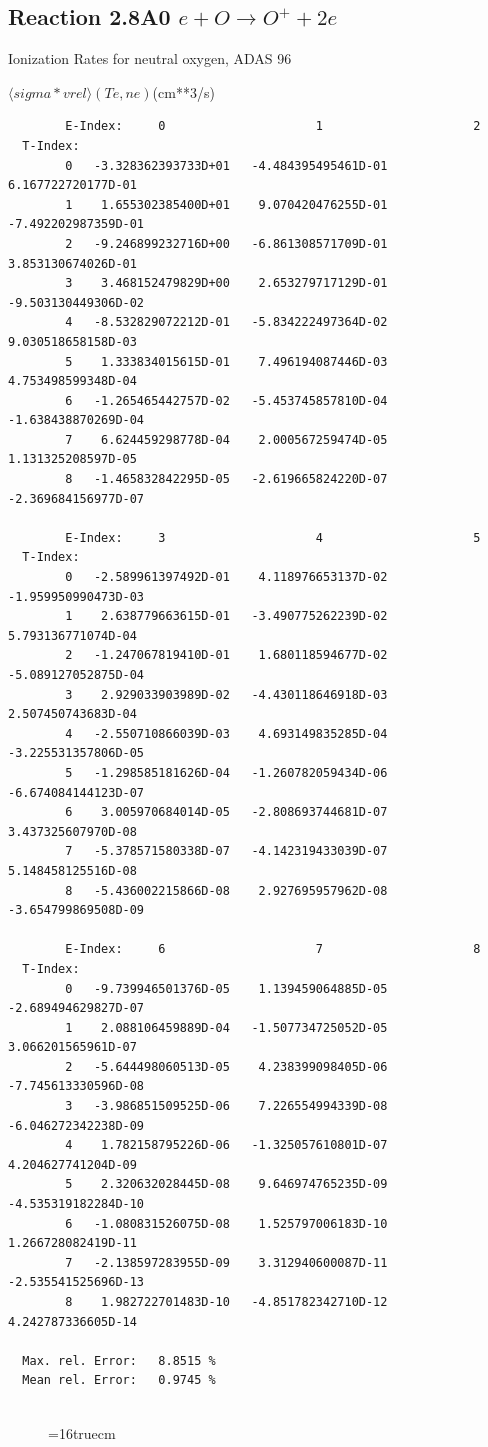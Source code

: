 \documentclass[12pt,dvips]{article}
\begin{document}
\subsection{
Reaction 2.8A0 $e + O \rightarrow O^+  + 2e $ }
  Ionization Rates for neutral  oxygen,   ADAS 96

$  \langle sigma*vrel \rangle(Te,ne) $(cm**3/s)
\begin{small}\begin{verbatim}
        E-Index:     0                     1                     2
  T-Index:
        0   -3.328362393733D+01   -4.484395495461D-01    6.167722720177D-01
        1    1.655302385400D+01    9.070420476255D-01   -7.492202987359D-01
        2   -9.246899232716D+00   -6.861308571709D-01    3.853130674026D-01
        3    3.468152479829D+00    2.653279717129D-01   -9.503130449306D-02
        4   -8.532829072212D-01   -5.834222497364D-02    9.030518658158D-03
        5    1.333834015615D-01    7.496194087446D-03    4.753498599348D-04
        6   -1.265465442757D-02   -5.453745857810D-04   -1.638438870269D-04
        7    6.624459298778D-04    2.000567259474D-05    1.131325208597D-05
        8   -1.465832842295D-05   -2.619665824220D-07   -2.369684156977D-07

        E-Index:     3                     4                     5
  T-Index:
        0   -2.589961397492D-01    4.118976653137D-02   -1.959950990473D-03
        1    2.638779663615D-01   -3.490775262239D-02    5.793136771074D-04
        2   -1.247067819410D-01    1.680118594677D-02   -5.089127052875D-04
        3    2.929033903989D-02   -4.430118646918D-03    2.507450743683D-04
        4   -2.550710866039D-03    4.693149835285D-04   -3.225531357806D-05
        5   -1.298585181626D-04   -1.260782059434D-06   -6.674084144123D-07
        6    3.005970684014D-05   -2.808693744681D-07    3.437325607970D-08
        7   -5.378571580338D-07   -4.142319433039D-07    5.148458125516D-08
        8   -5.436002215866D-08    2.927695957962D-08   -3.654799869508D-09

        E-Index:     6                     7                     8
  T-Index:
        0   -9.739946501376D-05    1.139459064885D-05   -2.689494629827D-07
        1    2.088106459889D-04   -1.507734725052D-05    3.066201565961D-07
        2   -5.644498060513D-05    4.238399098405D-06   -7.745613330596D-08
        3   -3.986851509525D-06    7.226554994339D-08   -6.046272342238D-09
        4    1.782158795226D-06   -1.325057610801D-07    4.204627741204D-09
        5    2.320632028445D-08    9.646974765235D-09   -4.535319182284D-10
        6   -1.080831526075D-08    1.525797006183D-10    1.266728082419D-11
        7   -2.138597283955D-09    3.312940600087D-11   -2.535541525696D-13
        8    1.982722701483D-10   -4.851782342710D-12    4.242787336605D-14

  Max. rel. Error:   8.8515 %
  Mean rel. Error:   0.9745 %


\end{verbatim}\end{small}
\begin{figure} \label{2.8A0}
\epsfxsize=16truecm 
\end{figure}
\newpage
\end{document}
